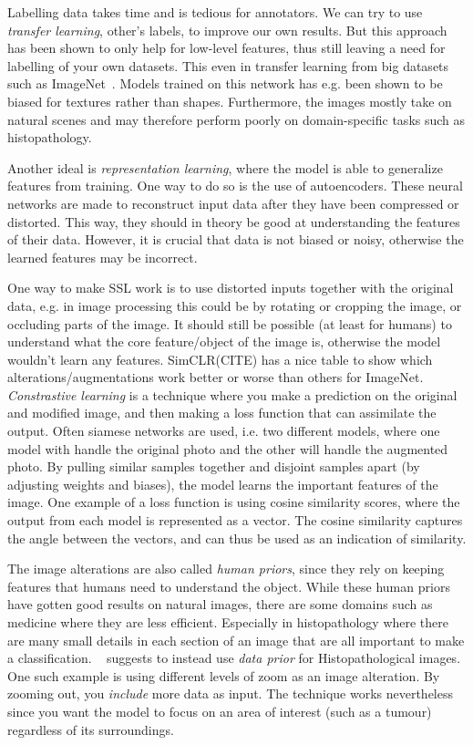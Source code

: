 \documentclass[10pt,twocolumn,letterpaper]{article}
\begin{document}
Labelling data takes time and is tedious for annotators. We can try to use \textit{transfer learning}, other's labels, to improve our own results. But this approach has been shown to only help for low-level features, thus still leaving a need for labelling of your own datasets. This even in transfer learning from big datasets such as ImageNet~\cite{imageNet}. Models trained on this network has e.g. been shown to be biased for textures rather than shapes. Furthermore, the images mostly take on natural scenes and may therefore perform poorly on domain-specific tasks such as histopathology.

Another ideal is \textit{representation learning}, where the model is able to generalize features from training. One way to do so is the use of autoencoders. These neural networks are made to reconstruct input data after they have been compressed or distorted. This way, they should in theory be good at understanding the features of their data. However, it is crucial that data is not biased or noisy, otherwise the learned features may be incorrect.

One way to make \gls{SSL} work is to use distorted inputs together with the original data, e.g. in image processing this could be by rotating or cropping the image, or occluding parts of the image. It should still be possible (at least for humans) to understand what the core feature/object of the image is, otherwise the model wouldn't learn any features. SimCLR(CITE) has a nice table to show which alterations/augmentations work better or worse than others for ImageNet. \textit{Constrastive learning} is a technique where you make a prediction on the original and modified image, and then making a loss function that can assimilate the output. Often siamese networks are used, i.e. two different models, where one model with handle the original photo and the other will handle the augmented photo. By pulling similar samples together and disjoint samples apart (by adjusting weights and biases), the model learns the important features of the image. One example of a loss function is using cosine similarity scores, where the output from each model is represented as a vector. The cosine similarity captures the angle between the vectors, and can thus be used as an indication of similarity. 

The image alterations are also called \textit{human priors}, since they rely on keeping features that humans need to understand the object. While these human priors have gotten good results on natural images, there are some domains such as medicine where they are less efficient. Especially in histopathology where there are many small details in each section of an image that are all important to make a classification. ~\cite{dataPriors} suggests to instead use \textit{data prior} for Histopathological images. One such example is using different levels of zoom as an image alteration. By zooming out, you \textit{include} more data as input. The technique works nevertheless since you want the model to focus on an area of interest (such as a tumour) regardless of its surroundings.
\end{document}
